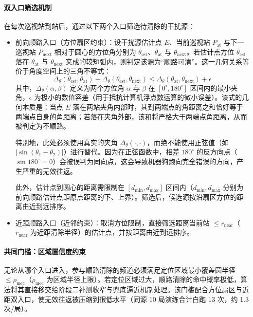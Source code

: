 \documentclass[UTF8, zihao=5,AutoFakeBold=2]{ctexart}
\begin{document}
\paragraph{双入口筛选机制}
在每次巡视站到站后，通过以下两个入口筛选待清除的干扰源：
\begin{itemize}
    \item 前向顺路入口（方位扇区约束）：设干扰源估计点 \(E\)、当前巡视站 \(P_{\text{at}}\) 与下一巡视站 \(P_{\text{next}}\) 相对于圆心的方位角分别为 \(\theta_{\text{est}}\)、\(\theta_{\text{at}}\) 与 \(\theta_{\text{next}}\)。若估计点方位 \(\theta_{\text{est}}\) 落在 \(\theta_{\text{at}}\) 与 \(\theta_{\text{next}}\) 夹成的较短弧内，则判定该源为“顺路可清”。这一几何关系等价于角度空间上的三角不等式：
    \begin{equation}
    \Delta_\theta(\theta_{\text{est}}, \theta_{\text{at}}) + \Delta_\theta(\theta_{\text{est}}, \theta_{\text{next}}) \leq \Delta_\theta(\theta_{\text{at}}, \theta_{\text{next}}) + \epsilon
    \end{equation}
    其中，\(\Delta_\theta(\alpha, \beta)\) 定义为两个方位角 \(\alpha\) 与 \(\beta\) 在 \([0^\circ, 180^\circ]\) 区间内的最小夹角，\(\epsilon\) 为极小的数值容差（用于抵抗计算机浮点数运算的微小误差）。该式的几何本质是：当点 \(E\) 落在两站夹角内部时，其到两端点的角距离之和恰好等于两端点自身的角距离；若落在夹角外部，该和将严格大于两端点角距离，从而被判定为不顺路。
    
    特别地，此处必须使用真实的夹角 \(\Delta_\theta(\cdot, \cdot)\)，而绝不能使用正弦值（如 \(|\sin(\theta_1 - \theta_2)|\)）进行替代。因为在正弦函数中，相差 \(180^\circ\) 的反方向点（\(\sin 180^\circ = 0\)）会被误判为同向点，这会导致机器狗跑向完全错误的方向，产生严重的无效往返。
    
    此外，估计点到圆心的距离需限制在 \([d_{\min}, d_{\max}]\) 区间内（\(d_{\min}, d_{\max}\) 分别为前向顺路估计点距原点距离的下、上界）。筛选后，候选源按沿扇区方位的距离由近到远排序。
    \item 近距顺路入口（近邻约束）：取消方位限制，直接筛选距离当前站 \(\leq r_{\text{near}}\)（\(r_{\text{near}}\) 为近距清除半径）的估计点，并按距离由近到远排序。
\end{itemize}

\paragraph{共同门槛：区域置信度约束}
无论从哪个入口进入，参与顺路清除的频道必须满足定位区域最小覆盖圆半径 \(\leq \rho_{\text{mec}}\)（\(\rho_{\text{mec}}\) 为区域半径上限）。若定位区域过大，顺路清除的命中概率极低，算法将其直接移交给阶段二补测收窄与兜底逼近机制处理。该门槛配合方位扇区与近距双入口，使无效往返被压缩到很低水平（同源 10 局演练合计白跑 13 次，约 1.3 次/局）。
\end{document}
